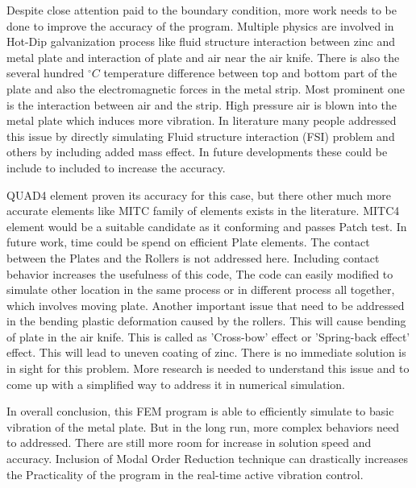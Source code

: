 \documentclass[main.tex]{subfiles}
\begin{document}
Despite close attention paid to the boundary condition, more work needs to be done to improve the accuracy of the program. Multiple physics are involved in Hot-Dip galvanization process like fluid structure interaction between zinc and metal plate and interaction of plate and air near the air knife. There is also the several hundred $^{\circ}C$ temperature difference between top and bottom part of the plate and also the  electromagnetic forces in the metal strip. Most prominent one is the interaction between air and the strip. High pressure air is blown into the metal plate which induces more vibration. In literature many people addressed this issue by directly simulating Fluid structure interaction (FSI) problem and others by including added mass effect. In future developments these could be include to included to increase the accuracy. 

QUAD4 element proven its accuracy for this case, but there other much more accurate elements like MITC family of elements exists in the literature. MITC4 element would be a suitable candidate as it conforming and passes Patch test. In future work, time could be spend on efficient Plate elements.  The contact between the Plates and the Rollers is not addressed here. Including contact behavior increases the usefulness of this code, The code can easily modified to simulate other location in the same process or in different process all together, which involves moving plate. Another important issue that need to be addressed in the bending plastic deformation caused by the rollers. This will cause  bending of  plate in the air knife. This is called as 'Cross-bow' effect or 'Spring-back effect' effect. This will lead to uneven coating of zinc.  There is no immediate solution is in sight for this problem. More research is needed to understand this issue and to come up with a simplified way to address it in numerical simulation. 

In overall conclusion, this FEM program is able to efficiently simulate to basic vibration of the metal plate. But in the long run, more complex behaviors need to addressed. There are still more room for increase in solution speed and accuracy. Inclusion of Modal Order Reduction technique can drastically increases the Practicality of the program in the real-time active vibration control.
\end{document}
